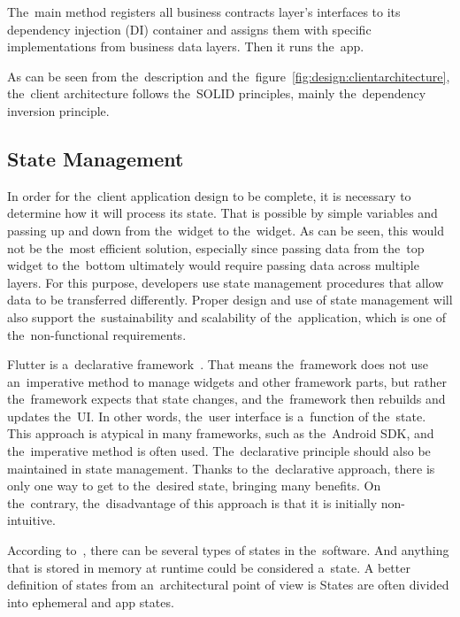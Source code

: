 The~main method registers all business contracts layer's interfaces to its dependency injection (DI) container and assigns them with specific implementations from business data layers.
Then it runs the~app.

\pagebreak

As can be seen from the~description and the~figure~\ref{fig:design:clientarchitecture}, the~client architecture follows the~SOLID principles, mainly the~dependency inversion principle. 

\subsection{State Management}

In order for the~client application design to be complete, it is necessary to determine how it will process its state.
That is possible by simple variables and passing up and down from the~widget to the~widget.
As can be seen, this would not be the~most efficient solution, especially since passing data from the~top widget to the~bottom ultimately would require passing data across multiple layers.
For this purpose, developers use state management procedures that allow data to be transferred differently.
Proper design and use of state management will also support the~sustainability and scalability of the~application, which is one of the~non-functional requirements.

Flutter is a~declarative framework~\cite{a2022_flutter_declarative}.
That means the~framework does not use an~imperative method to manage widgets and other framework parts, but rather the~framework expects that state changes, and the~framework then rebuilds and updates the~UI.
In other words, the~user interface is a~function of the~state.
This approach is atypical in many frameworks, such as the~Android SDK, and the~imperative method is often used.
The~declarative principle should also be maintained in state management.
Thanks to the~declarative approach, there is only one way to get to the~desired state, bringing many benefits.
On the~contrary, the~disadvantage of this approach is that it is initially non-intuitive.

According to~\cite{a2022_differentiate}, there can be several types of states in the~software.
And anything that is stored in memory at runtime could be considered a~state.
A better definition of states from an~architectural point of view is 
States are often divided into ephemeral and app states.

